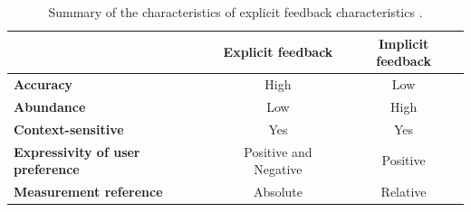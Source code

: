 \begin{table}[h]
\centering
\begin{tabular}{|l|c|c|}
\hline
 & \textbf{Explicit feedback} & \textbf{Implicit feedback} \\
\hline
\textbf{Accuracy} & High & Low \\
\hline
\textbf{Abundance} & Low & High \\
\hline
\textbf{Context-sensitive} & Yes & Yes \\
\hline
\textbf{Expressivity of user preference} & Positive and Negative & Positive \\
\hline
\textbf{Measurement reference} & Absolute & Relative \\
\hline
\end{tabular}
\caption{Summary of the characteristics of explicit feedback characteristics   \parencite{article_implicit_vs_explicit}.}
\label{tab:feedback_characteristics}
\end{table}